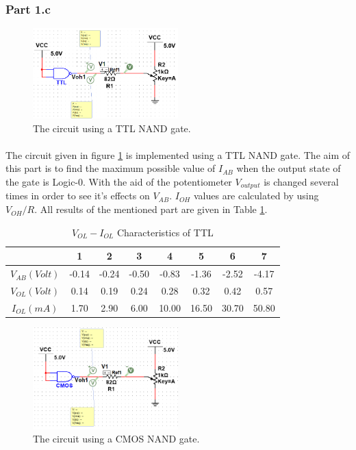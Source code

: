 \documentclass[pdftex,12pt,a4paper]{article}
\begin{document}
\newpage
\begin{flushleft}
\subsubsection{Part 1.c}

 \begin{figure}[h]
    	\centering
    	\includegraphics[width=0.5\textwidth]{part1c-ttl.png}	
    	\caption{The circuit using a TTL NAND gate.}
    	\label{fig:3-part1c-ttl}
\end{figure}

\paragraph{}The circuit given in figure \ref{fig:3-part1c-ttl} is implemented using a TTL NAND gate. The aim of this part is to find the maximum possible value of $I_{AB}$ when the output state of the gate is Logic-0. With the aid of the potentiometer $V_{output}$ is changed several times in order to see it's effects on $V_{AB}$. $I_{OH}$ values are calculated by using $V_{OH}/R$. All results of the mentioned part are given in Table \ref{part1c-ttl}.

\begin{table}[h]
\begin{tabular}{c|c|c|c|c|c|c|c|}
                & 1     & 2     & 3     & 4     & 5     & 6     & 7     \\ \hline
$V_{AB} (Volt)$ & -0.14 & -0.24 & -0.50 & -0.83 & -1.36 & -2.52 & -4.17 \\ \hline
$V_{OL} (Volt)$ & 0.14  & 0.19  & 0.24  & 0.28  & 0.32  & 0.42  & 0.57  \\ \hline
$I_{OL} (mA)$   & 1.70   & 2.90   & 6.00     & 10.00    & 16.50  & 30.70  & 50.80 
\end{tabular}
\centering
\caption{$V_{OL} - I_{OL}$ Characteristics of TTL}
\label{part1c-ttl}
\end{table}


 \begin{figure}[h]
    	\centering
    	\includegraphics[width=0.5\textwidth]{part1c-cmos.png}	
    	\caption{The circuit using a CMOS NAND gate.}
    	\label{fig:3-part1c-cmos}
\end{figure}


\end{flushleft}
\end{document}
